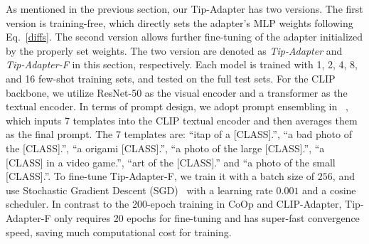 \documentclass[10pt,twocolumn,letterpaper]{article}
\begin{document}


As mentioned in the previous section, our Tip-Adapter has two versions. The first version is training-free, which directly sets the adapter's MLP weights following Eq.~\eqref{diffs}. The second version allows further fine-tuning of the adapter initialized by the properly set weights. The two version are denoted as \textit{Tip-Adapter} and \textit{Tip-Adapter-F} in this section, respectively.
Each model is trained with 1, 2, 4, 8, and 16 few-shot training sets, and tested on the full test sets. For the CLIP backbone, we utilize ResNet-50 \cite{he2016deep} as the visual encoder and a transformer \cite{dosovitskiy2021vit} as the textual encoder. In terms of prompt design, we adopt prompt ensembling in ~\cite{radford2021learning}, which inputs 7 templates into the CLIP textual encoder and then averages them as the final prompt. The 7 templates are: ``itap of a [CLASS].'', ``a bad photo of the [CLASS].'', ``a origami [CLASS].'', ``a photo of the large [CLASS].'', ``a [CLASS] in a video game.'', ``art of the [CLASS].'' and ``a photo of the small [CLASS].''.
To fine-tune Tip-Adapter-F, we train it with a batch size of $256$, and use Stochastic Gradient Descent (SGD)~\cite{kingma2014adam,loshchilov2017decoupled} with a learning rate $0.001$ and a cosine scheduler. In contrast to the 200-epoch training in CoOp and CLIP-Adapter, Tip-Adapter-F only requires 20 epochs for fine-tuning and has super-fast convergence speed, saving much computational cost for training. 
\end{document}
